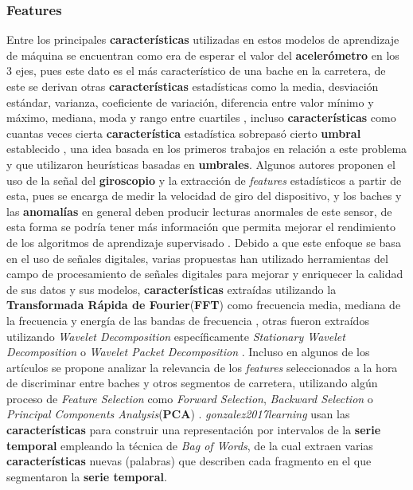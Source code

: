 		\subsubsection{Features}
			Entre los principales \textbf{características} utilizadas en estos modelos de aprendizaje de máquina se encuentran como era de esperar el valor 
			del \textbf{acelerómetro} en los 3 ejes, pues este dato es el más característico de una bache en la carretera, de este se derivan otras
			\textbf{características} estadísticas como la media, desviación estándar, varianza, coeficiente de variación, diferencia entre valor mínimo y
			máximo, mediana, moda y rango entre cuartiles , incluso \textbf{características} como cuantas veces cierta \textbf{característica} estadística sobrepasó cierto \textbf
			{umbral} establecido , una idea basada en los primeros trabajos en relación a este problema y que utilizaron
			heurísticas basadas en \textbf{umbrales}. Algunos autores proponen el uso de la señal del \textbf{giroscopio} y la extracción de \emph
			{features} estadísticos a partir de esta, pues se encarga de medir la velocidad de giro del dispositivo, y los baches y las \textbf{anomalías}
			en general deben producir lecturas anormales de este sensor, de esta forma se podría tener más información que permita mejorar el
			rendimiento de los algoritmos de aprendizaje supervisado . Debido a que este enfoque
			se basa en el uso de señales digitales, varias propuestas han utilizado herramientas del campo de procesamiento de señales digitales
			para mejorar y enriquecer la calidad de sus datos y sus modelos, \textbf{características} extraídas utilizando la \textbf{Transformada Rápida
			de Fourier}(\textbf{FFT}) como frecuencia media, mediana de la frecuencia y energía de las bandas de frecuencia , otras fueron extraídos utilizando \emph{Wavelet Decomposition} específicamente \emph{Stationary Wavelet
			Decomposition}  o \emph{Wavelet Packet Decomposition} . Incluso en algunos de
			los artículos se propone analizar la relevancia de los \emph {features} seleccionados a la hora de discriminar entre baches y otros
			segmentos de carretera, utilizando algún proceso de \emph{Feature Selection} como \emph{Forward Selection}, \emph{Backward Selection}
			o \emph{Principal Components Analysis}(\textbf{PCA}) . \emph{gonzalez2017learning} usan las \textbf{características}
			para construir una representación por intervalos de la \textbf{serie temporal} empleando la técnica de \emph{Bag of Words}, de la cual extraen
			varias \textbf{características} nuevas (palabras) que describen cada fragmento en el que segmentaron la \textbf{serie temporal}.

